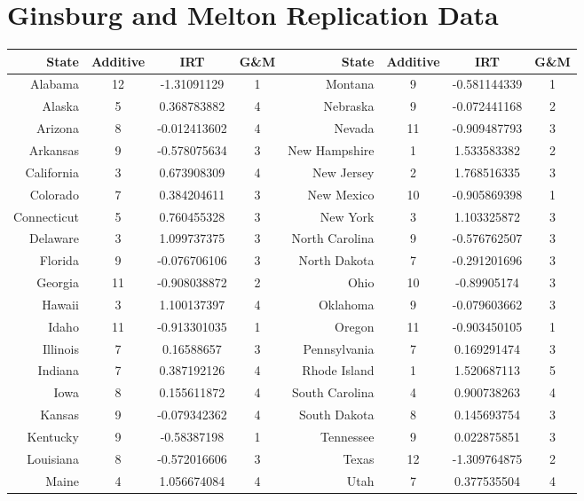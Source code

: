 \documentclass[12pt]{article}
\begin{document}
\newpage\section{Ginsburg and Melton Replication Data}\label{GMData}
\begin{table}[!h]\centering\footnotesize
	\begin{tabular}{|r|ccc|r|ccc|}\hline
		State	&	Additive	&	IRT	&	G\&M	&	State	& Additive	&	IRT	&	G\&M	\\	\hline
		Alabama	&	12	&	-1.31091129	&	1	&	Montana	&	9	&	-0.581144339	&	1	\\	
		Alaska	&	5	&	0.368783882	&	4	&	Nebraska	&	9	&	-0.072441168	&	2	\\	
		Arizona	&	8	&	-0.012413602	&	4	&	Nevada	&	11	&	-0.909487793	&	3	\\	
		Arkansas	&	9	&	-0.578075634	&	3	&	New Hampshire	&	1	&	1.533583382	&	2	\\	
		California	&	3	&	0.673908309	&	4	&	New Jersey	&	2	&	1.768516335	&	3	\\	
		Colorado	&	7	&	0.384204611	&	3	&	New Mexico	&	10	&	-0.905869398	&	1	\\	
		Connecticut	&	5	&	0.760455328	&	3	&	New York	&	3	&	1.103325872	&	3	\\	
		Delaware	&	3	&	1.099737375	&	3	&	North Carolina	&	9	&	-0.576762507	&	3	\\	
		Florida	&	9	&	-0.076706106	&	3	&	North Dakota	&	7	&	-0.291201696	&	3	\\	
		Georgia	&	11	&	-0.908038872	&	2	&	Ohio	&	10	&	-0.89905174	&	3	\\	
		Hawaii	&	3	&	1.100137397	&	4	&	Oklahoma	&	9	&	-0.079603662	&	3	\\	
		Idaho	&	11	&	-0.913301035	&	1	&	Oregon	&	11	&	-0.903450105	&	1	\\	
		Illinois	&	7	&	0.16588657	&	3	&	Pennsylvania	&	7	&	0.169291474	&	3	\\	
		Indiana	&	7	&	0.387192126	&	4	&	Rhode Island	&	1	&	1.520687113	&	5	\\	
		Iowa	&	8	&	0.155611872	&	4	&	South Carolina	&	4	&	0.900738263	&	4	\\	
		Kansas	&	9	&	-0.079342362	&	4	&	South Dakota	&	8	&	0.145693754	&	3	\\	
		Kentucky	&	9	&	-0.58387198	&	1	&	Tennessee	&	9	&	0.022875851	&	3	\\	
		Louisiana	&	8	&	-0.572016606	&	3	&	Texas	&	12	&	-1.309764875	&	2	\\	
		Maine	&	4	&	1.056674084	&	4	&	Utah	&	7	&	0.377535504	&	4	\\	

\end{tabular}
\end{table}
\end{document}
